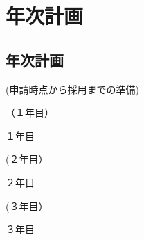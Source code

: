 \section{年次計画}

\subsection{年次計画}
\vspace*{10pt}
	\noindent
	(申請時点から採用までの準備)
	
{%
}%
	
    	\noindent
    	（１年目）
	
{%
		１年目
}%

	\vspace{5mm}
	\noindent
	(２年目）
	
{%
		２年目
}%

	\vspace{5mm}
	\noindent
	(３年目）
	
{%
		３年目
}%




